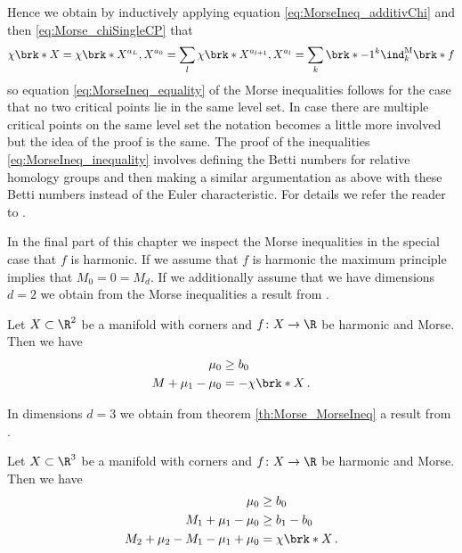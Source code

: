 Hence we obtain by inductively applying equation \eqref{eq:MorseIneq_additivChi}
and then \eqref{eq:Morse_chiSingleCP} that
\begin{align*}
  \chi\brk*{X}=\chi\brk*{X^{a_L},X^{a_0}}=\sum_l \chi\brk*{X^{a_{l+1}},X^{a_l}}
  =\sum_k\brk*{-1}^k\ind^\text{M}_k\brk*{f}
\end{align*}
so equation \eqref{eq:MorseIneq_equality} of the Morse inequalities follows
for the case that no two critical points lie in the same level set.
In case there are multiple critical points on the same level set the notation
becomes a little more involved but the idea of the proof is the same.
The proof of the inequalities \eqref{eq:MorseIneq_inequality} involves defining the
Betti numbers for relative homology groups and then making a similar argumentation
as above with these Betti numbers instead of the Euler characteristic. For details we refer the reader to \cite[§5]{Milnor1963}.


In the final part of this chapter we inspect the Morse inequalities in the special case
that $f$ is harmonic.
If we assume that $f$ is harmonic the maximum principle implies that
$M_0=0=M_d$.
If we additionally assume that we have dimensions $d=2$ we obtain from the Morse inequalities
a result from \cite[Corollary 10.1]{Morse1969}.
\begin{corollary}
  Let $X\subset\R^2$ be a manifold with corners and $f\colon X\to\R$ be harmonic and Morse.
  Then we have
  \begin{align*}
    \mu_0&\geq b_0 \\
    M+\mu_1-\mu_0&=-\chi\brk*{X}\,.
  \end{align*}
\end{corollary}
In dimensions $d=3$ we obtain from theorem \ref{th:Morse_MorseIneq} a result from \cite[Corollary 10.2]{Morse1969}.
\begin{corollary}
  Let $X\subset\R^3$ be a manifold with corners and $f\colon X\to\R$ be harmonic and Morse.
  Then we have
  \begin{align*}
    \mu_0&\geq b_0 \\
    M_1+\mu_1-\mu_0&\geq b_1-b_0 \\
    M_2+\mu_2-M_1-\mu_1+\mu_0&= \chi\brk*{X}\,.
  \end{align*}
\end{corollary}


